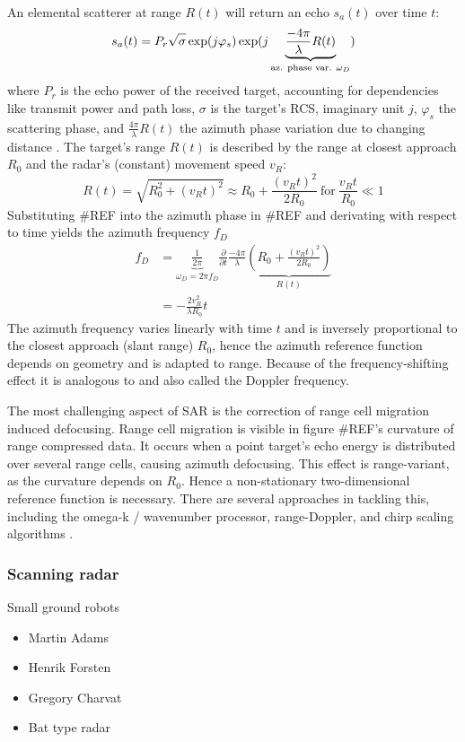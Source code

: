 An elemental scatterer at range \(R(t)\) will return an echo \(s_a(t)\)
over time \(t\): \[
s_a(t) = P_r \sqrt{\sigma\vphantom{1}} \exp(j\varphi_s)\exp(j \underbrace{\frac{-4\pi}{\lambda}R(t)}_\text{az. phase var. $\omega_D$})
\] where \(P_r\) is the echo power of the received target, accounting
for dependencies like transmit power and path loss, \(\sigma\) is the
target's RCS, imaginary unit \(j\), \(\varphi_s\) the scattering phase,
and \(\frac{4\pi}{\lambda}R(t)\) the azimuth phase variation due to
changing distance \cite{Cumming2004}. The target's range \(R(t)\) is
described by the range at closest approach \(R_0\) and the radar's
(constant) movement speed \(v_R\): \[
R(t) = \sqrt{R_0^2+\left(v_Rt\right)^2} \approx R_0 + \frac{(v_Rt)^2}{2R_0} ~\text{for}~ \frac{v_Rt}{R_0} \ll 1
\] Substituting \#REF into the azimuth phase in \#REF and derivating
with respect to time yields the azimuth frequency \(f_D\) \[
\begin{aligned}
f_D &= \underbrace{\frac{1}{2\pi}}_{\omega_D = 2\pi f_D} \frac{\partial}{\partial t} \frac{-4\pi}{\lambda}  \underbrace{\left( R_0 + \frac{(v_Rt)^2}{2R_0}  \right)}_{R(t)} \\
&= -\frac{2v_R^2}{\lambda R_0}t
\end{aligned}
\] The azimuth frequency varies linearly with time \(t\) and is
inversely proportional to the closest approach (slant range) \(R_0\),
hence the azimuth reference function depends on geometry and is adapted
to range. Because of the frequency-shifting effect it is analogous to
and also called the Doppler frequency.

The most challenging aspect of SAR is the correction of range cell
migration induced defocusing. Range cell migration is visible in figure
\#REF's curvature of range compressed data. It occurs when a point
target's echo energy is distributed over several range cells, causing
azimuth defocusing. This effect is range-variant, as the curvature
depends on \(R_0\). Hence a non-stationary two-dimensional reference
function is necessary. There are several approaches in tackling this,
including the omega-k / wavenumber processor, range-Doppler, and chirp
scaling algorithms \cite{Moreira2013}.

\subsubsection{Scanning radar}\label{scanning-radar}

Small ground robots

\begin{itemize}
\tightlist
\item
  Martin Adams
\item
  Henrik Forsten
\item
  Gregory Charvat
\item
  Bat type radar
\end{itemize}

